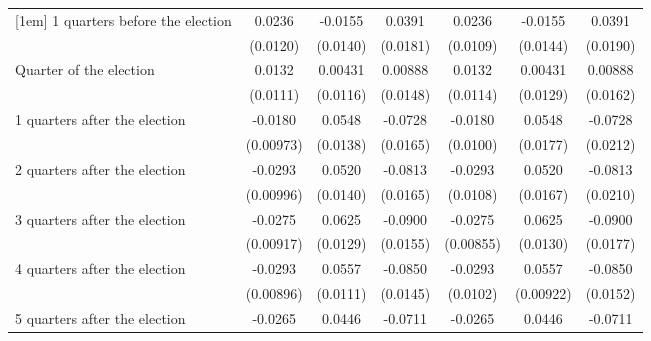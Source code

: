 \begin{table}[!ht]
\begin{tabular}{l*{6}{c}}
[1em]
 1 quarters before the election&      0.0236\sym{*}  &     -0.0155         &      0.0391\sym{*}  &      0.0236\sym{*}  &     -0.0155         &      0.0391\sym{*}  \\
                    &    (0.0120)         &    (0.0140)         &    (0.0181)         &    (0.0109)         &    (0.0144)         &    (0.0190)         \\
[1em]
Quarter of the election&      0.0132         &     0.00431         &     0.00888         &      0.0132         &     0.00431         &     0.00888         \\
                    &    (0.0111)         &    (0.0116)         &    (0.0148)         &    (0.0114)         &    (0.0129)         &    (0.0162)         \\
[1em]
 1 quarters after the election&     -0.0180         &      0.0548\sym{***}&     -0.0728\sym{***}&     -0.0180         &      0.0548\sym{**} &     -0.0728\sym{***}\\
                    &   (0.00973)         &    (0.0138)         &    (0.0165)         &    (0.0100)         &    (0.0177)         &    (0.0212)         \\
[1em]
 2 quarters after the election&     -0.0293\sym{**} &      0.0520\sym{***}&     -0.0813\sym{***}&     -0.0293\sym{**} &      0.0520\sym{**} &     -0.0813\sym{***}\\
                    &   (0.00996)         &    (0.0140)         &    (0.0165)         &    (0.0108)         &    (0.0167)         &    (0.0210)         \\
[1em]
 3 quarters after the election&     -0.0275\sym{**} &      0.0625\sym{***}&     -0.0900\sym{***}&     -0.0275\sym{**} &      0.0625\sym{***}&     -0.0900\sym{***}\\
                    &   (0.00917)         &    (0.0129)         &    (0.0155)         &   (0.00855)         &    (0.0130)         &    (0.0177)         \\
[1em]
 4 quarters after the election&     -0.0293\sym{**} &      0.0557\sym{***}&     -0.0850\sym{***}&     -0.0293\sym{**} &      0.0557\sym{***}&     -0.0850\sym{***}\\
                    &   (0.00896)         &    (0.0111)         &    (0.0145)         &    (0.0102)         &   (0.00922)         &    (0.0152)         \\
[1em]
 5 quarters after the election&     -0.0265\sym{**} &      0.0446\sym{***}&     -0.0711\sym{***}&     -0.0265\sym{*}  &      0.0446\sym{**} &     -0.0711\sym{***}\\

\end{tabular}
\end{table}
